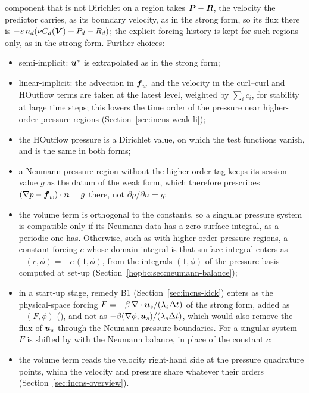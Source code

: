component that is not Dirichlet on a region takes $\boldsymbol{P}-\boldsymbol{R}$, the
velocity the predictor carries, as its boundary velocity, as in the strong
form, so its flux there is $-s\,n_d(\nu C_d(\boldsymbol{V})+P_d-R_d)$; the
explicit-forcing history is kept for such regions only, as in the strong
form. Further choices:
\begin{itemize}
  \item semi-implicit: $\boldsymbol{u}^*$ is extrapolated as in the strong form;
  \item linear-implicit: the advection in $\boldsymbol{f}_w$ and the velocity in
  the curl--curl and HOutflow terms are taken at the latest level, weighted by
  $\sum_ic_i$, for stability at
  large time steps; this lowers the time order of the pressure near
  higher-order pressure regions (Section~\ref{sec:incns-weak-li});
  \item the HOutflow pressure is a Dirichlet value, on which the test
  functions vanish, and is the same in both forms;
  \item a Neumann pressure region without the higher-order tag keeps its
  session value $g$ as the datum of the weak form, which therefore prescribes
  $(\nabla p-\boldsymbol{f}_w)\cdot\boldsymbol{n}=g$ there, not
  $\partial p/\partial n=g$;
  \item the volume term is orthogonal to the constants, so a singular
  pressure system is compatible only if its Neumann data has a zero surface
  integral, as a periodic one has. Otherwise, such as with higher-order
  pressure regions, a constant forcing $c$ whose domain integral is that
  surface integral enters as $-(c,\phi)=-c\,(1,\phi)$, from the integrals
  $(1,\phi)$ of the pressure basis computed at set-up
  (Section~\ref{hopbc:sec:neumann-balance});
  \item in a start-up stage, remedy B1 (Section~\ref{sec:incns-kick})
  enters as the physical-space forcing
  $F=-\beta\,\nabla\cdot\boldsymbol{u}_s/(\lambda_s\Delta t)$ of the strong form,
  added as $-(F,\phi)$ (), and not as
  $-\beta(\nabla\phi,\boldsymbol{u}_s)/(\lambda_s\Delta t)$, which would also
  remove the flux of $\boldsymbol{u}_s$ through the Neumann pressure boundaries.
  For a singular system $F$ is shifted by  with the
  Neumann balance, in place of the constant $c$;
  \item the volume term reads the velocity right-hand side at the pressure
  quadrature points, which the velocity and pressure share whatever their
  orders (Section~\ref{sec:incns-overview}).
\end{itemize}

